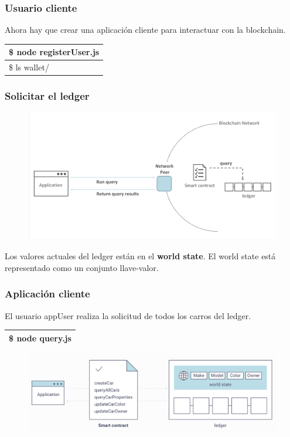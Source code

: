 \documentclass{beamer}
\begin{document}
	\begin{frame}
		\frametitle{Usuario cliente}
		Ahora hay que crear una aplicación cliente para interactuar con la blockchain. 
		\begin{center}
			\begin{tabulary}{\linewidth}{L}
				\hline
				\$ node registerUser.js \\
				\hline
				\$ ls wallet/ \\
				\hline
			\end{tabulary} 
		\end{center}
	\end{frame}

	\begin{frame}
		\frametitle{Solicitar el ledger}
		\begin{figure}[h]
			\includegraphics[scale=.4]{app_02}
			\centering
		\end{figure}
		Los valores actuales del ledger están en el \textbf{world state}. El world state está representado como un conjunto llave-valor.
	\end{frame}
	
	\begin{frame}
		\frametitle{Aplicación cliente}
		El usuario appUser realiza la solicitud de todos los carros del ledger.
		\begin{center}
			\begin{tabulary}{\linewidth}{L}
				\hline
				\$ node query.js \\
				\hline
			\end{tabulary} 
		\end{center}
		\begin{figure}[h]
			\includegraphics[scale=.4]{app_03}
			\centering
		\end{figure}
	\end{frame}
	
\end{document}
